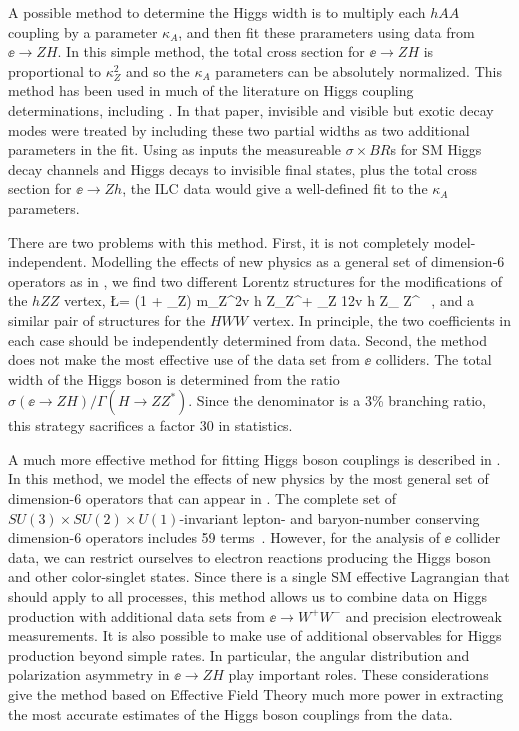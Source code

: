 A possible method to determine the Higgs width is to multiply each $hAA$ coupling by a parameter $\kappa_A$, and then fit these prarameters using data from $\ee\to ZH$.   In this simple method, the total cross section for $\ee\to ZH$ is proportional to $\kappa_Z^2$ and so the $\kappa_A$ parameters can be absolutely normalized.   This method has been used in much of the literature on Higgs coupling determinations, including \cite{Fujii:2015jha}.  In that paper, invisible and visible but exotic decay modes were treated by including these two partial widths as two additional parameters in the fit.  Using as inputs the measureable $\sigma\times BR$s for SM Higgs decay channels and Higgs decays to invisible final states, plus the total cross section for $\ee\to Zh$,  the ILC data would give a well-defined fit to the $\kappa_A$ parameters.

There are two problems with this method.  First, it is not completely model-independent.  Modelling the effects of new physics as a general set of dimension-6 operators as in , we find two different Lorentz structures for the modifications of the $hZZ$ vertex,
\beq
   \Delta \L =    (1 + \eta_Z) {m_Z^2\over v}  h Z_\mu Z^\mu + \zeta_Z {1\over 2v} h
   Z_{\mu\nu} Z^{\mu\nu} \ ,
and a similar pair of structures for the $HWW$ vertex.  In principle, the two coefficients  in each case should be independently determined from data.  Second, the method does not make the most effective use of the data set from $\ee$ colliders.  The total width of the Higgs boson is determined from the ratio  $\sigma(\ee\to ZH)/\Gamma(H\to ZZ^*)$.  Since the denominator is a 3\% branching ratio, this strategy sacrifices a factor 30 in 
statistics.

A much more effective method for fitting Higgs boson couplings is described in \cite{Barklow:2017suo}.   In this method, we model the effects of new physics by the most general set of dimension-6 operators that can appear in .  The complete set of $SU(3)\times SU(2)\times U(1)$-invariant lepton- and baryon-number conserving dimension-6 operators  includes 59 terms~\cite{Grzadkowski:2010es}.  However, for 
the analysis of $\ee$ collider data, we can restrict ourselves to electron reactions 
producing the Higgs boson and other color-singlet states.  Since there is a single SM effective
 Lagrangian that should apply to all processes, this method allows us to combine data on 
Higgs production with additional data sets from $\ee\to W^+W^-$ and precision electroweak
measurements.   It is also possible to make use of additional observables for Higgs production
beyond simple rates.  In particular, the angular distribution and polarization asymmetry in 
$\ee\to ZH$ play important roles.  These considerations give the method based on 
Effective Field Theory much more power in extracting the most accurate estimates 
of the 
Higgs boson couplings from the data.

